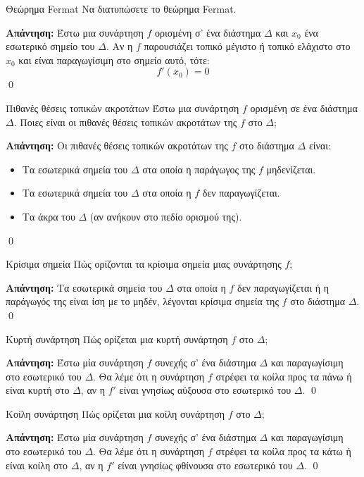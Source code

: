 \documentclass[a4paper, 12pt]{article}
\renewenvironment{proof}[1][\textbf{Απάντηση}]{%
  \par\noindent\textbf{#1:} \rmfamily}{\qed\par}
\begin{document}
\begin{theorem}{Θεώρημα Fermat}
  Να διατυπώσετε το θεώρημα Fermat.
\end{theorem}
\begin{proof}
  Έστω μια συνάρτηση $f$ ορισμένη σ’ ένα διάστημα $Δ$ και $x_0$ ένα εσωτερικό σημείο του $Δ$. Αν η $f$ παρουσιάζει τοπικό μέγιστο ή τοπικό ελάχιστο στο $x_0$ και είναι παραγωγίσιμη στο σημείο αυτό, τότε:
  $$f ′(x_0) = 0$$
\end{proof}

\begin{theorem}{Πιθανές θέσεις τοπικών ακροτάτων}
  Έστω μια συνάρτηση $f$ ορισμένη σε ένα διάστημα $Δ$. Ποιες είναι οι πιθανές θέσεις τοπικών ακροτάτων της $f$ στο $Δ$;
\end{theorem}
\begin{proof}
  Οι πιθανές θέσεις τοπικών ακροτάτων της $f$ στο διάστημα $Δ$ είναι:
  \begin{itemize}
    \item Τα εσωτερικά σημεία του $Δ$ στα οποία η παράγωγος της $f$ μηδενίζεται.
    \item Τα εσωτερικά σημεία του $Δ$ στα οποία η $f$ δεν παραγωγίζεται.
    \item Τα άκρα του $Δ$ (αν ανήκουν στο πεδίο ορισμού της).
  \end{itemize}
\end{proof}

\begin{theorem}{Κρίσιμα σημεία}
  Πώς ορίζονται τα κρίσιμα σημεία μιας συνάρτησης $f$;
\end{theorem}
\begin{proof}
  Τα εσωτερικά σημεία του $Δ$ στα οποία η $f$ δεν παραγωγίζεται ή η παράγωγός της είναι ίση με το μηδέν, λέγονται κρίσιμα σημεία της $f$ στο διάστημα $Δ$.
\end{proof}

\begin{theorem}{Κυρτή συνάρτηση}
  Πώς ορίζεται μια κυρτή συνάρτηση $f$ στο $Δ$;
\end{theorem}
\begin{proof}
  Έστω μία συνάρτηση $f$ συνεχής σ' ένα διάστημα $Δ$ και παραγωγίσιμη στο εσωτερικό του $Δ$. Θα λέμε ότι η συνάρτηση $f$ στρέφει τα κοίλα προς τα πάνω ή είναι κυρτή στο $Δ$, αν η $f '$ είναι γνησίως αύξουσα στο εσωτερικό του $Δ$.
\end{proof}

\begin{theorem}{Κοίλη συνάρτηση}
  Πώς ορίζεται μια κοίλη συνάρτηση $f$ στο $Δ$;
\end{theorem}
\begin{proof}
  Έστω μία συνάρτηση $f$ συνεχής σ' ένα διάστημα $Δ$ και παραγωγίσιμη στο εσωτερικό του $Δ$. Θα λέμε ότι η συνάρτηση $f$ στρέφει τα κοίλα προς τα κάτω ή είναι κοίλη στο $Δ$, αν η $f '$ είναι γνησίως φθίνουσα στο εσωτερικό του $Δ$.
\end{proof}
\end{document}
